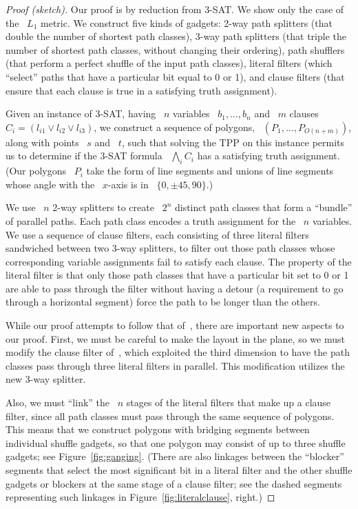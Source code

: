 \documentclass[11pt]{article}
\begin{document}
\begin{proof}[Proof (sketch)]
Our proof is by reduction from 3-SAT.
We show only the case of the ~\(L_1\) metric.
We construct five kinds of gadgets: 2-way path splitters (that double the number of shortest path classes), 3-way path splitters (that triple the number of shortest path classes, without changing their ordering), path shufflers (that perform a perfect shuffle of the input path classes), literal filters (which ``select'' paths that have a particular bit equal to 0 or 1), and clause filters (that ensure that each clause is true in a satisfying truth assignment).

Given an instance of 3-SAT, having ~\(n\) variables ~\(b_1, \ldots, b_n\) and ~\(m\) clauses ~\(C_i = (l_{i1} \vee l_{i2} \vee l_{i3})\), we construct a sequence of polygons, ~\((P_1, \ldots, P_{O(n+m)})\), along with points ~\(s\) and ~\(t\), such that solving the TPP on this instance permits us to determine if the 3-SAT formula ~\(\bigwedge_i C_i\) has a satisfying truth assignment.
(Our polygons ~\(P_i\) take the form of line segments and unions of line segments whose angle with the ~\(x\)-axis is in ~\(\{0, \pm 45, 90\}\).)

We use ~\(n\) 2-way splitters to create ~\(2^n\) distinct path classes that form a ``bundle'' of parallel paths.
Each path class encodes a truth assignment for the ~\(n\) variables.
We use a sequence of clause filters, each consisting of three literal filters sandwiched between two 3-way splitters, to filter out those path classes whose corresponding variable assignments fail to satisfy each clause.
The property of the literal filter is that only those path classes that have a particular bit set to 0 or 1 are able to pass through the filter without having a detour (a requirement to go through a horizontal segment) force the path to be longer than the others.

While our proof attempts to follow that of~\cite{ref4}, there are important new aspects to our proof.
First, we must be careful to make the layout in the plane, so we must modify the clause filter of~\cite{ref4}, which exploited the third dimension to have the path classes pass through three literal filters in parallel.
This modification utilizes the new 3-way splitter.

Also, we must ``link'' the ~\(n\) stages of the literal filters that make up a clause filter, since all path classes must pass through the same sequence of polygons.
This means that we construct polygons with bridging segments between individual shuffle gadgets, so that one polygon may consist of up to three shuffle gadgets; see Figure~\ref{fig:ganging}.
(There are also linkages between the ``blocker'' segments that select the most significant bit in a literal filter and the other shuffle gadgets or blockers at the same stage of a clause filter; see the dashed segments representing such linkages in Figure~\ref{fig:literalclause}, right.)


\end{proof}
\end{document}
